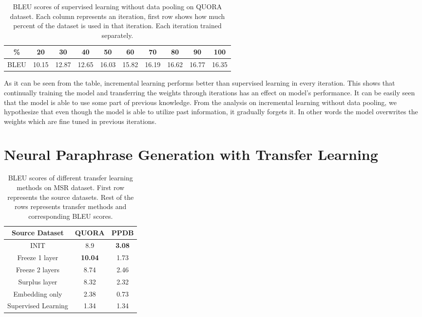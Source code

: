\begin{table}[t]
\centering
\large
 \begin{tabular}{|c | c | c | c | c | c | c | c | c | c |} 
 \hline
 \% & 20 & 30 & 40 & 50 & 60 & 70 & 80 & 90 & 100 \\ [0.5ex] 
 \hline
  BLEU & 10.15 & 12.87 & 12.65 & 16.03 & 15.82 & 16.19 & 16.62 & 16.77 & 16.35  \\ 
 \hline
\end{tabular}
\caption{BLEU scores of supervised learning without data pooling on QUORA dataset. Each column represents an iteration, first row shows how much percent of the dataset is used in that iteration. Each iteration trained separately.}
\end{table}

As it can be seen from the table, incremental learning performs better than supervised learning in every iteration. This shows that continually training the model and transferring the weights through iterations has an effect on model's performance. It can be easily seen that the model is able to use some part of previous knowledge. From the analysis on incremental learning without data pooling, we hypothesize that even though the model is able to utilize past information, it gradually forgets it. In other words the model overwrites the weights which are fine tuned in previous iterations.

\section{Neural Paraphrase Generation with Transfer Learning}

\begin{table}[t]
\centering
\large
 \begin{tabular}{|c | c | c |} 
 \hline
 Source Dataset & QUORA & PPDB \\ [0.5ex] 
 \hline
  INIT & 8.9 & \textbf{3.08}  \\ 
 \hline
  Freeze 1 layer & \textbf{10.04} & 1.73  \\ 
 \hline
  Freeze 2 layers & 8.74 & 2.46  \\ 
 \hline
  Surplus layer & 8.32 & 2.32  \\ 
 \hline
  Embedding only & 2.38 & 0.73  \\ 
 \hline
  Supervised Learning & 1.34 & 1.34  \\ 
 \hline
\end{tabular}
\caption{BLEU scores of different transfer learning methods on MSR dataset. First row represents the source datasets. Rest of the rows represents transfer methods and corresponding BLEU scores.}
\end{table}

